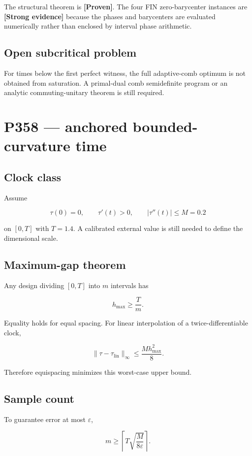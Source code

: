 \documentclass[11pt,a4paper,openany]{report}
\newcommand{\statusProven}{\textcolor{fingreen}{[Proven]}}
\newcommand{\statusStrong}{\textcolor{finblue}{[Strong evidence]}}
\begin{document}
The structural theorem is \textbf{\statusProven{}}. The four FIN zero-barycenter instances are \textbf{\statusStrong{}} because the phases and barycenters are evaluated numerically rather than enclosed by interval phase arithmetic.

\section{Open subcritical problem}

For times below the first perfect witness, the full adaptive-comb optimum is not obtained from saturation. A primal-dual comb semidefinite program or an analytic commuting-unitary theorem is still required.

\chapter{P358 --- anchored bounded-curvature time}

\section{Clock class}

Assume

\[
\tau(0)=0,\qquad
\tau'(t)>0,\qquad
|\tau''(t)|\leq M=0.2
\]

on \([0,T]\) with \(T=1.4\). A calibrated external value is still needed to define the dimensional scale.

\section{Maximum-gap theorem}

Any design dividing \([0,T]\) into \(m\) intervals has

\[
h_{\max}\geq\frac{T}{m}.
\]

Equality holds for equal spacing. For linear interpolation of a twice-differentiable clock,

\[
\|\tau-\tau_{\mathrm{lin}}\|_\infty
\leq \frac{M h_{\max}^2}{8}.
\]

Therefore equispacing minimizes this worst-case upper bound.

\section{Sample count}

To guarantee error at most \(\varepsilon\),

\[
m\geq
\left\lceil
T\sqrt{\frac{M}{8\varepsilon}}
\right\rceil.
\]
\end{document}
